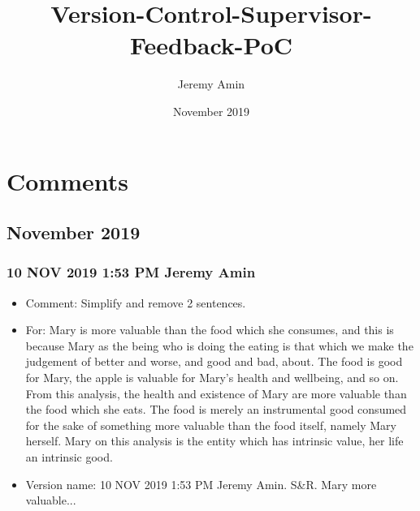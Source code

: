 \documentclass{article}
\title{Version-Control-Supervisor-Feedback-PoC}
\author{Jeremy Amin}
\date{November 2019}
\begin{document}
\maketitle
\tableofcontents

\pagebreak

\section{Comments}

\subsection{November 2019}

\subsubsection{10 NOV 2019 1:53 PM Jeremy Amin}

\begin{itemize}
    \item Comment: Simplify and remove 2 sentences.
    \item For: Mary is more valuable than the food which she consumes, and this is because Mary as the being who is doing the eating is that which we make the judgement of better and worse, and good and bad, about. The food is good for Mary, the apple is valuable for Mary’s health and wellbeing, and so on. From this analysis, the health and existence of Mary are more valuable than the food which she eats. The food is merely an instrumental good consumed for the sake of something more valuable than the food itself, namely Mary herself. Mary on this analysis is the entity which has intrinsic value, her life an intrinsic good.
    \item Version name: 10 NOV 2019 1:53 PM Jeremy Amin. S\&R. Mary more valuable...
\end{itemize}
\end{document}
